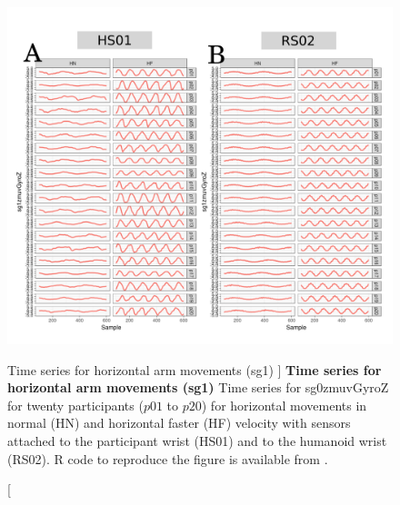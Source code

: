 \begin{figure}
\centering
\includegraphics[width=1.0\textwidth]{aH-sg1}
    	\caption
	[Time series for horizontal arm movements (sg1) ]{
	{\bf Time series for horizontal arm movements (sg1)}
		Time series for sg0zmuvGyroZ for twenty participants 
		($p01$ to  $p20$) 
		for horizontal movements in normal (HN) and horizontal faster (HF) 
		velocity with sensors attached to the participant wrist (HS01)
		and to the humanoid wrist (RS02).
	R code to reproduce the figure is available from \cite{xochicale2018}.
        }
    \label{fig:aH-sg1}
\end{figure}

